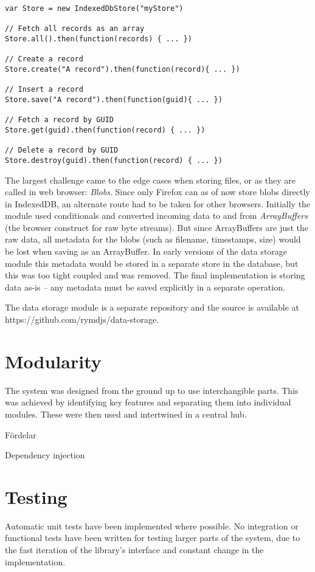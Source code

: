\begin{Code}
\begin{lstlisting}[caption=Common database operations]
var Store = new IndexedDbStore("myStore")

// Fetch all records as an array
Store.all().then(function(records) { ... })

// Create a record
Store.create("A record").then(function(record){ ... })

// Insert a record
Store.save("A record").then(function(guid){ ... })

// Fetch a record by GUID
Store.get(guid).then(function(record) { ... })

// Delete a record by GUID
Store.destroy(guid).then(function(record) { ... })
\end{lstlisting}
\end{Code}

The largest challenge came to the edge cases when storing files, or as they are called in web browser: \emph{Blobs}. Since only Firefox can as of now store blobs directly in IndexedDB, an alternate route had to be taken for other browsers. Initially the module used conditionals and converted incoming data to and from \emph{ArrayBuffers} (the browser construct for raw byte streams). But since ArrayBuffers are just the raw data, all metadata for the blobs (such as filename, timestamps, size) would be lost when saving as an ArrayBuffer. In early versions of the data storage module this metadata would be stored in a separate store in the database, but this was too tight coupled and was removed. The final implementation is storing data as-is – any metadata must be saved explicitly in a separate operation.

The data storage module is a separate repository and the source is available at https://github.com/rymdjs/data-storage.

\section{Modularity}

The system was designed from the ground up to use interchangible parts. This was achieved by identifying key features and separating them into individual modules. These were then used and intertwined in a central hub.

Fördelar

Dependency injection

\section{Testing}
\label{sec:testing}
Automatic unit tests have been implemented where possible. No integration or functional tests have been written for testing larger parts of the system, due to the fast iteration of the library's interface and constant change in the implementation. 
